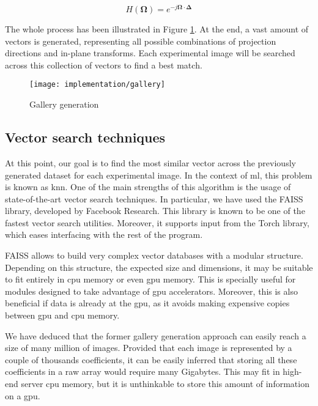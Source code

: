 \documentclass[../main.tex]{subfiles}
\begin{document}
\begin{equation}\label{eq:4:shift}
    H(\bm{\Omega}) = e^{-j\bm{\Omega} \cdot \bm{\Delta}}
\end{equation}

The whole process has been illustrated in Figure \ref{fig:4:gallery}. At the end, a vast amount of vectors is generated, representing all possible combinations of projection directions and in-plane transforms. Each experimental image will be searched across this collection of vectors to find a best match.

\begin{figure}[htbp]
    \centering
    \texttt{[image: implementation/gallery]}
    \caption{Gallery generation}
    \label{fig:4:gallery}
\end{figure}

\subsection{Vector search techniques}
At this point, our goal is to find the most similar vector across the previously generated dataset for each experimental image. In the context of \gls{ml}, this problem is known as \gls{knn}. One of the main strengths of this algorithm is the usage of state-of-the-art vector search techniques. In particular, we have used the FAISS library\cite{johnson2019}, developed by Facebook Research. This library is known to be one of the fastest vector search utilities. Moreover, it supports input from the Torch library, which eases interfacing with the rest of the program.

FAISS allows to build very complex vector databases with a modular structure. Depending on this structure, the expected size and dimensions, it may be suitable to fit entirely in \gls{cpu} memory or even \gls{gpu} memory. This is specially useful for modules designed to take advantage of \gls{gpu} accelerators. Moreover, this is also beneficial if data is already at the \gls{gpu}, as it avoids making expensive copies between \gls{gpu} and \gls{cpu} memory.

We have deduced that the former gallery generation approach can easily reach a size of many million of images. Provided that each image is represented by a couple of thousands coefficients, it can be easily inferred that storing all these coefficients in a raw array would require many Gigabytes. This may fit in high-end server \gls{cpu} memory, but it is unthinkable to store this amount of information on a \gls{gpu}.
\end{document}
